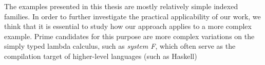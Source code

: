 \documentclass[a4paper,msc,twosized=semi]{uustthesis}
\begin{document}
  The examples presented in this thesis are mostly relatively simple indexed families. In order to further investigate the practical applicability of our work, we think that it is essential to study how our approach applies to a more complex example. Prime candidates for this purpose are more complex variations on the simply typed lambda calculus, such as \emph{system F}, which often serve as the compilation target of higher-level languages (such as Haskell)


\backmatter
\listoffigures



\end{document}
